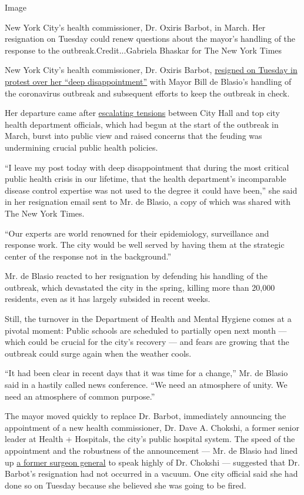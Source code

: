 Image

New York City's health commissioner, Dr. Oxiris Barbot, in March. Her
resignation on Tuesday could renew questions about the mayor's handling
of the response to the outbreak.Credit...Gabriela Bhaskar for The New
York Times

New York City's health commissioner, Dr. Oxiris Barbot,
\href{https://www.nytimes.com/2020/08/04/nyregion/oxiris-barbot-health-commissioner-resigns.html}{resigned
on Tuesday in protest over her ``deep disappointment''} with Mayor Bill
de Blasio's handling of the coronavirus outbreak and subsequent efforts
to keep the outbreak in check.

Her departure came after
\href{https://www.nytimes.com/2020/05/14/nyregion/coronavirus-de-blasio-mitchell-katz.html}{escalating
tensions} between City Hall and top city health department officials,
which had begun at the start of the outbreak in March, burst into public
view and raised concerns that the feuding was undermining crucial public
health policies.

``I leave my post today with deep disappointment that during the most
critical public health crisis in our lifetime, that the health
department's incomparable disease control expertise was not used to the
degree it could have been,'' she said in her resignation email sent to
Mr. de Blasio, a copy of which was shared with The New York Times.

``Our experts are world renowned for their epidemiology, surveillance
and response work. The city would be well served by having them at the
strategic center of the response not in the background.''

Mr. de Blasio reacted to her resignation by defending his handling of
the outbreak, which devastated the city in the spring, killing more than
20,000 residents, even as it has largely subsided in recent weeks.

Still, the turnover in the Department of Health and Mental Hygiene comes
at a pivotal moment: Public schools are scheduled to partially open next
month --- which could be crucial for the city's recovery --- and fears
are growing that the outbreak could surge again when the weather cools.

``It had been clear in recent days that it was time for a change,'' Mr.
de Blasio said in a hastily called news conference. ``We need an
atmosphere of unity. We need an atmosphere of common purpose.''

The mayor moved quickly to replace Dr. Barbot, immediately announcing
the appointment of a new health commissioner, Dr. Dave A. Chokshi, a
former senior leader at Health + Hospitals, the city's public hospital
system. The speed of the appointment and the robustness of the
announcement --- Mr. de Blasio had lined up
\href{https://wayback.archive-it.org/4765/20170106172109/https:/www.hhs.gov/about/leadership/vadm-vivek-murthy/index.html}{a
former surgeon general} to speak highly of Dr. Chokshi --- suggested
that Dr. Barbot's resignation had not occurred in a vacuum. One city
official said she had done so on Tuesday because she believed she was
going to be fired.

